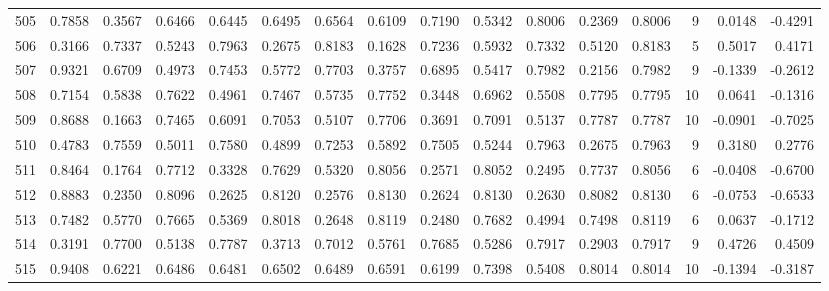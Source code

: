 \begin{tabular}{lrrrrrrrrrrrrrrr}
505 &      0.7858 &  0.3567 &  0.6466 &  0.6445 &  0.6495 &  0.6564 &  0.6109 &  0.7190 &  0.5342 &  0.8006 &   0.2369 &     0.8006 &      9 &                    0.0148 &                    -0.4291 \\
506 &      0.3166 &  0.7337 &  0.5243 &  0.7963 &  0.2675 &  0.8183 &  0.1628 &  0.7236 &  0.5932 &  0.7332 &   0.5120 &     0.8183 &      5 &                    0.5017 &                     0.4171 \\
507 &      0.9321 &  0.6709 &  0.4973 &  0.7453 &  0.5772 &  0.7703 &  0.3757 &  0.6895 &  0.5417 &  0.7982 &   0.2156 &     0.7982 &      9 &                   -0.1339 &                    -0.2612 \\
508 &      0.7154 &  0.5838 &  0.7622 &  0.4961 &  0.7467 &  0.5735 &  0.7752 &  0.3448 &  0.6962 &  0.5508 &   0.7795 &     0.7795 &     10 &                    0.0641 &                    -0.1316 \\
509 &      0.8688 &  0.1663 &  0.7465 &  0.6091 &  0.7053 &  0.5107 &  0.7706 &  0.3691 &  0.7091 &  0.5137 &   0.7787 &     0.7787 &     10 &                   -0.0901 &                    -0.7025 \\
510 &      0.4783 &  0.7559 &  0.5011 &  0.7580 &  0.4899 &  0.7253 &  0.5892 &  0.7505 &  0.5244 &  0.7963 &   0.2675 &     0.7963 &      9 &                    0.3180 &                     0.2776 \\
511 &      0.8464 &  0.1764 &  0.7712 &  0.3328 &  0.7629 &  0.5320 &  0.8056 &  0.2571 &  0.8052 &  0.2495 &   0.7737 &     0.8056 &      6 &                   -0.0408 &                    -0.6700 \\
512 &      0.8883 &  0.2350 &  0.8096 &  0.2625 &  0.8120 &  0.2576 &  0.8130 &  0.2624 &  0.8130 &  0.2630 &   0.8082 &     0.8130 &      6 &                   -0.0753 &                    -0.6533 \\
513 &      0.7482 &  0.5770 &  0.7665 &  0.5369 &  0.8018 &  0.2648 &  0.8119 &  0.2480 &  0.7682 &  0.4994 &   0.7498 &     0.8119 &      6 &                    0.0637 &                    -0.1712 \\
514 &      0.3191 &  0.7700 &  0.5138 &  0.7787 &  0.3713 &  0.7012 &  0.5761 &  0.7685 &  0.5286 &  0.7917 &   0.2903 &     0.7917 &      9 &                    0.4726 &                     0.4509 \\
515 &      0.9408 &  0.6221 &  0.6486 &  0.6481 &  0.6502 &  0.6489 &  0.6591 &  0.6199 &  0.7398 &  0.5408 &   0.8014 &     0.8014 &     10 &                   -0.1394 &                    -0.3187 \\

\end{tabular}

